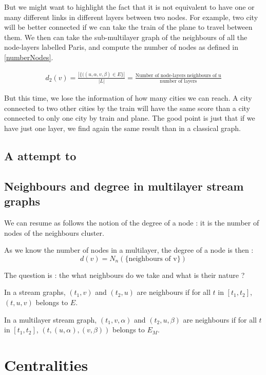 \documentclass[dvipsnames,a4paper,11pt]{article}
\theoremstyle{definition}
\theoremstyle{remark}
\theoremstyle{remark}
\begin{document}
		But we might want to highlight the fact that it is not equivalent to have one or many different links in different layers between two nodes. For example, two city will be better connected if we can take the train of the plane to travel between them.  We then can take the sub-multilayer graph of the neighbours of all the node-layers labelled Paris, and compute the number of nodes as defined in \ref{numberNodes}. 
		
		\begin{align}
			d_2(v)= \frac{|\{((u,\alpha,v,\beta) \in E\}|}{|L|} = \frac{\text{Number of node-layers neighbours of u}}{\text{number of layers}}
		\end{align}
		
		But this time, we lose the information of how many cities we can reach. A city connected to two other cities by the train will have the same score than a city connected to only one city by train and plane. The good point is just that if we have just one layer, we find again the same result than in a classical graph.
		
		\subsection{A attempt to }
		
		\subsection{Neighbours and degree in multilayer stream graphs}
		
		We can resume as follows the notion of the degree of a node : it is the number of nodes of the neighbours cluster. 
		
		As we know the number of nodes in a multilayer, the degree of a node is then : 
		$$
			d(v) = N_n(\{\text{neighbours of v}\})
		$$
		
		The question is : the what neighbours do we take and what is their nature ?
		
		In a stream graphs, $(t_1,v)$ and $(t_2,u)$ are neighbours if for all $t$ in $[t_1,t_2]$, $(t,u,v)$ belongs to $E$.
		
		In a multilayer stream graph, $(t_1,v,\alpha)$ and $(t_2,u,\beta)$ are neighbours if for all $t$ in $[t_1,t_2]$, $(t,(u,\alpha),(v,\beta))$ belongs to $E_M$.
		
	\section{Centralities}
		
\end{document}
